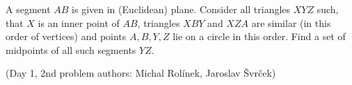 A segment $AB$ is given in (Euclidean) plane. Consider all triangles $XYZ$ such, that $X$ is an inner point of $AB$, triangles $XBY$ and $XZA$ are similar (in this order of vertices) and points $A, B, Y, Z$ lie on a circle in this order. Find a set of midpoints of all such segments $YZ$.

(Day 1, 2nd problem
authors: Michal Rolínek, Jaroslav Švrček)